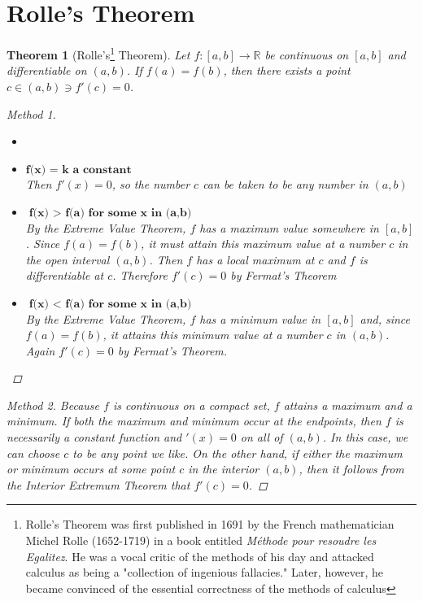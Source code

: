 \documentclass[10pt]{report}
\newtheorem{thm2}{Theorem}[section]
\begin{document}
\section{Rolle's Theorem}
\begin{thm2} [Rolle's\footnote{Rolle's Theorem was first published in 1691 by the French mathematician Michel Rolle (1652-1719) in a book entitled \textit{M\'{e}thode pour resoudre les Egalitez}. He was a vocal critic of the methods of his day and attacked calculus as being a "collection of ingenious fallacies." Later, however, he became convinced of the essential correctness of the methods of calculus} Theorem]
Let $f:[a,b]\to\mathbb{R}$ be continuous on $[a,b]$ and differentiable on $(a,b)$. If $f(a)=f(b)$, then there exists a point $c\in(a,b)\ni f'(c)=0$.
\begin{proof}[Method 1]
\begin{itemize}
Proof by cases\item[1:]
\item[1:]$\textbf{f(x) = k a constant}$\\
Then $f'(x)=0$, so the number $c$ can be taken to be any number in $(a,b)$
\item[2:]$\textbf{f(x) $>$ f(a) for some x in (a,b)}$\\
By the Extreme Value Theorem, $f$ has a maximum value somewhere in $[a,b]$. Since $f(a)=f(b)$, it must attain this maximum value at a number $c$ in the open interval $(a,b)$. Then $f$ has a local maximum at $c$ and $f$ is differentiable at $c$. Therefore $f'(c)=0$ by Fermat's Theorem
\item[3:]$\textbf{f(x) $<$ f(a) for some x in (a,b)}$\\
By the Extreme Value Theorem, $f$ has a minimum value in $[a,b]$ and, since $f(a)=f(b)$, it attains this minimum value at a number $c$ in $(a,b)$. Again $f'(c)=0$ by Fermat's Theorem.
\end{itemize}
\end{proof}
\begin{proof}[Method 2]
Because $f$ is continuous on a compact set, $f$ attains a maximum and a minimum. If both the maximum and minimum occur at the endpoints, then $f$ is necessarily a constant function and $'(x)=0$ on all of $(a,b)$. In this case, we can choose $c$ to be any point we like. On the other hand, if either the maximum or minimum occurs at some point $c$ in the interior $(a,b)$, then it follows from the Interior Extremum Theorem that $f'(c) = 0$.
\end{proof}
\end{thm2}
\end{document}
